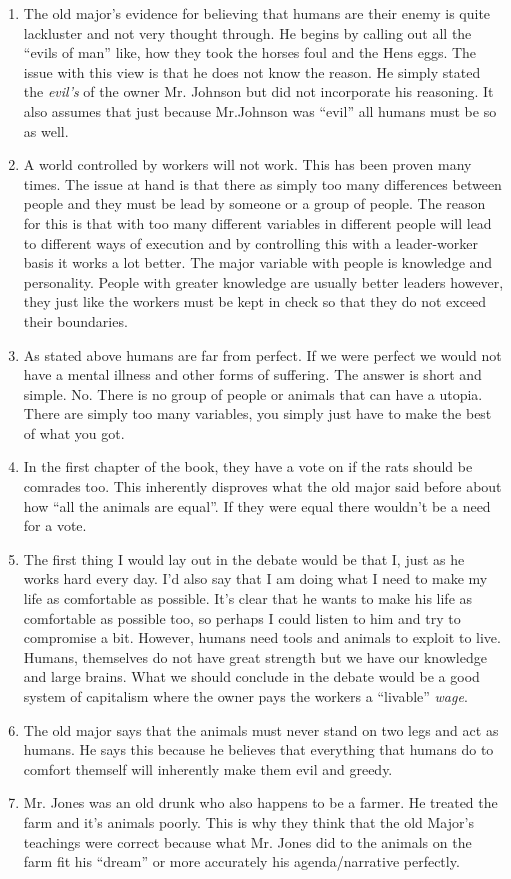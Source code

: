 \documentclass[12pt]{article}
\begin{document}
    \begin{enumerate}
        \item The old major's evidence for believing that humans are their enemy is quite lackluster and not very thought through. He begins by calling out all the ``evils of man'' like, how they took the horses foul and the Hens eggs. The issue with this view is that he does not know the reason. He simply stated the \textit{evil's} of the owner Mr. Johnson but did not incorporate his reasoning. It also assumes that just because Mr.Johnson was ``evil'' all humans must be so as well.
        \item A world controlled by workers will not work. This has been proven many times. The issue at hand is that there as simply too many differences between people and they must be lead by someone or a group of people. The reason for this is that with too many different variables in different people will lead to different ways of execution and by controlling this with a leader-worker basis it works a lot better. The major variable with people is knowledge and personality. People with greater knowledge are usually better leaders however, they just like the workers must be kept in check so that they do not exceed their boundaries.
        \item As stated above humans are far from perfect. If we were perfect we would not have a mental illness and other forms of suffering. The answer is short and simple. No. There is no group of people or animals that can have a utopia. There are simply too many variables, you simply just have to make the best of what you got.
        \item In the first chapter of the book, they have a vote on if the rats should be comrades too. This inherently disproves what the old major said before about how ``all the animals are equal''. If they were equal there wouldn't be a need for a vote.
        \item The first thing I would lay out in the debate would be that I, just as he works hard every day. I'd also say that I am doing what I need to make my life as comfortable as possible. It's clear that he wants to make his life as comfortable as possible too, so perhaps I could listen to him and try to compromise a bit. However, humans need tools and animals to exploit to live. Humans, themselves do not have great strength but we have our knowledge and large brains. What we should conclude in the debate would be a good system of capitalism where the owner pays the workers a ``livable'' \textit{wage}.
        \item The old major says that the animals must never stand on two legs and act as humans. He says this because he believes that everything that humans do to comfort themself will inherently make them evil and greedy.
        \item Mr. Jones was an old drunk who also happens to be a farmer. He treated the farm and it's animals poorly. This is why they think that the old Major's teachings were correct because what Mr. Jones did to the animals on the farm fit his ``dream'' or more accurately his agenda/narrative perfectly.
        
    \end{enumerate}
\end{document}
